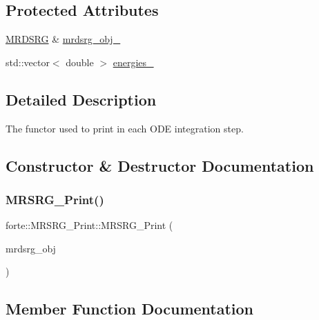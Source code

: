 \subsection*{Protected Attributes}
\begin{DoxyCompactItemize}
\item 
\mbox{\hyperlink{classforte_1_1_m_r_d_s_r_g}{M\+R\+D\+S\+RG}} \& \mbox{\hyperlink{classforte_1_1_m_r_s_r_g___print_a3bb9c5679b54dc70c465d07719206d7b}{mrdsrg\+\_\+obj\+\_\+}}
\item 
std\+::vector$<$ double $>$ \mbox{\hyperlink{classforte_1_1_m_r_s_r_g___print_abaaecdd3c6224840deee86a02e340ea5}{energies\+\_\+}}
\end{DoxyCompactItemize}


\subsection{Detailed Description}
The functor used to print in each O\+DE integration step. 

\subsection{Constructor \& Destructor Documentation}
\mbox{\label{classforte_1_1_m_r_s_r_g___print_a56e027b3196873204b921aeb12c8b4cd}} 
\subsubsection{\texorpdfstring{M\+R\+S\+R\+G\+\_\+\+Print()}{MRSRG\_Print()}}
{\footnotesize\ttfamily forte\+::\+M\+R\+S\+R\+G\+\_\+\+Print\+::\+M\+R\+S\+R\+G\+\_\+\+Print (\begin{DoxyParamCaption}\item[{\mbox{\hyperlink{classforte_1_1_m_r_d_s_r_g}{M\+R\+D\+S\+RG}} \&}]{mrdsrg\+\_\+obj }\end{DoxyParamCaption})\hspace{0.3cm}{\ttfamily [inline]}}



\subsection{Member Function Documentation}
\mbox{\label{classforte_1_1_m_r_s_r_g___print_a8d5ab384ba3bc2c1a4e07ed2862a94bb}} 

